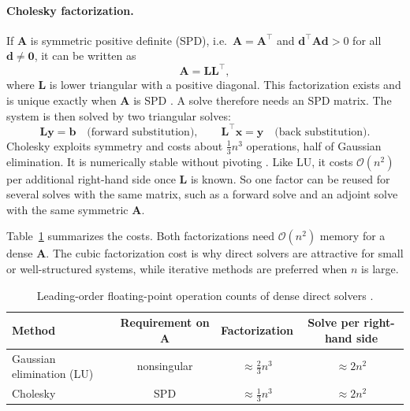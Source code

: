 \paragraph{Cholesky factorization.}
If $\mathbf{A}$ is symmetric positive definite (SPD), i.e.\ $\mathbf{A} = \mathbf{A}^\top$ and
$\mathbf{d}^\top \mathbf{A} \mathbf{d} > 0$ for all $\mathbf{d} \neq \mathbf{0}$, it can be written as
\begin{equation}
  \mathbf{A} = \mathbf{L} \mathbf{L}^\top ,
  \label{eq:cholesky}
\end{equation}
where $\mathbf{L}$ is lower triangular with a positive diagonal. This factorization
exists and is unique exactly when $\mathbf{A}$ is SPD \citep{wiki:cholesky,golub2013matrix}.
A solve therefore needs an SPD matrix. The system is then solved by two
triangular solves:
\begin{equation}
  \mathbf{L}\mathbf{y} = \mathbf{b} \quad \text{(forward substitution)}, \qquad
  \mathbf{L}^\top \mathbf{x} = \mathbf{y} \quad \text{(back substitution)} .
\end{equation}
Cholesky exploits symmetry and costs about $\tfrac{1}{3}n^3$ operations,
half of Gaussian elimination. It is numerically stable without pivoting
\citep{wiki:cholesky,trefethen1997numerical}. Like LU, it costs $\mathcal{O}(n^2)$ per
additional right-hand side once $\mathbf{L}$ is known. So one factor can be reused
for several solves with the same matrix, such as a forward solve and an
adjoint solve with the same symmetric $\mathbf{A}$.

Table~\ref{tab:direct-cost} summarizes the costs. Both factorizations need
$\mathcal{O}(n^2)$ memory for a dense $\mathbf{A}$. The cubic factorization cost is why direct
solvers are attractive for small or well-structured systems, while iterative
methods are preferred when $n$ is large.

\begin{table}[h]
  \centering
  \begin{tabular}{@{}lccc@{}}
    \toprule
    Method & Requirement on $\mathbf{A}$ & Factorization & Solve per right-hand side \\
    \midrule
    Gaussian elimination (LU) & nonsingular & $\approx \tfrac{2}{3}n^3$ & $\approx 2n^2$ \\
    Cholesky & SPD & $\approx \tfrac{1}{3}n^3$ & $\approx 2n^2$ \\
    \bottomrule
  \end{tabular}
  \caption{Leading-order floating-point operation counts of dense direct solvers
    \citep{golub2013matrix,trefethen1997numerical}.}
  \label{tab:direct-cost}
\end{table}

